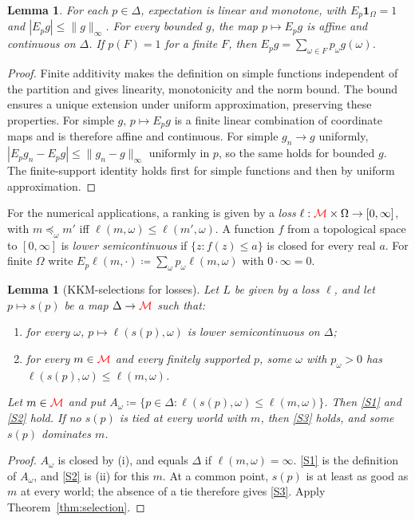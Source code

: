 \documentclass[11pt]{article}
\newcommand{\chg}[1]{{\color{red}#1}}
\newtheorem{lemma}[theorem]{Lemma}
\theoremstyle{definition}
\theoremstyle{remark}
\newcommand{\M}{\mathcal M}
\begin{document}
\begin{lemma}\label{lem:prob}
For each $p\in\Delta$, expectation is linear and monotone, with $E_p\mathbf1_\Omega=1$ and $|E_pg|\le\|g\|_\infty$. For every bounded $g$, the map $p\mapsto E_pg$ is affine and continuous on $\Delta$. If $p(F)=1$ for a finite $F$, then $E_pg=\sum_{\omega\in F}p_\omega g(\omega)$.
\end{lemma}
\begin{proof}
Finite additivity makes the definition on simple functions independent of the partition and gives linearity, monotonicity and the norm bound. The bound ensures a unique extension under uniform approximation, preserving these properties. For simple $g$, $p\mapsto E_pg$ is a finite linear combination of coordinate maps and is therefore affine and continuous. For simple $g_n\to g$ uniformly, $|E_pg_n-E_pg|\le\|g_n-g\|_\infty$ uniformly in $p$, so the same holds for bounded $g$. The finite-support identity holds first for simple functions and then by uniform approximation.
\end{proof}

For the numerical applications, a ranking is given by a \emph{loss} $\ell:\chg{\M}\times\Omega\to[0,\infty]$, with $m\preceq_\omega m'$ iff $\ell(m,\omega)\le\ell(m',\omega)$. A function $f$ from a topological space to $[0,\infty]$ is \emph{lower semicontinuous} if $\{z:f(z)\le a\}$ is closed for every real $a$. For finite $\Omega$ write $E_p\ell(m,\cdot)\coloneqq\sum_\omega p_\omega\ell(m,\omega)$ with $0\cdot\infty=0$.

\begin{lemma}[KKM-selections for losses]\label{lem:loss-one-stage}
Let $L$ be given by a loss $\ell$, and let $p\mapsto s(p)$ be a map $\Delta\to\chg{\M}$ such that:
\begin{enumerate}[label=(\roman*)]
\item for every $\omega$, $p\mapsto\ell(s(p),\omega)$ is lower semicontinuous on $\Delta$;
\item for every $m\in\chg{\M}$ and every finitely supported $p$, some $\omega$ with $p_\omega>0$ has $\ell(s(p),\omega)\le\ell(m,\omega)$.
\end{enumerate}
Let $m\in\chg{\M}$ and put $A_\omega\coloneqq\{p\in\Delta:\ell(s(p),\omega)\le\ell(m,\omega)\}$. Then \ref{S1} and \ref{S2} hold. If no $s(p)$ is tied at every world with $m$, then \ref{S3} holds, and some $s(p)$ dominates $m$.
\end{lemma}
\begin{proof}
$A_\omega$ is closed by (i), and equals $\Delta$ if $\ell(m,\omega)=\infty$. \ref{S1} is the definition of $A_\omega$, and \ref{S2} is (ii) for this $m$. \chg{At a common point, $s(p)$ is at least as good as $m$ at every world; the absence of a tie therefore gives \ref{S3}.} Apply Theorem~\ref{thm:selection}.
\end{proof}
\end{document}
